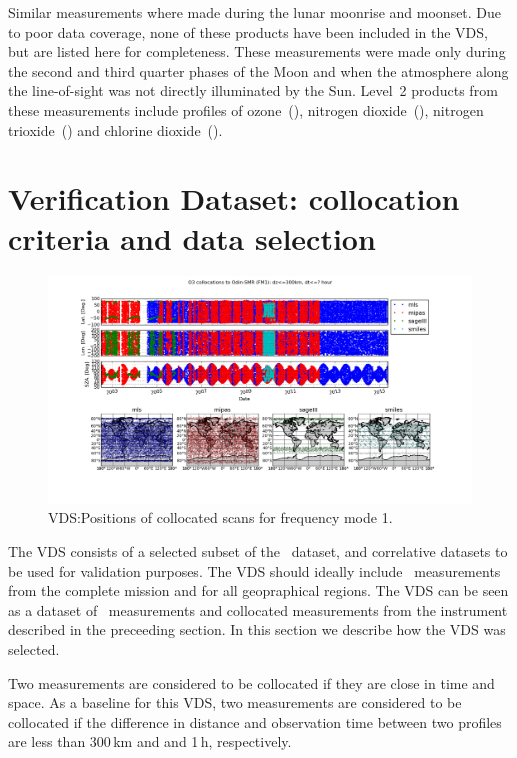 Similar measurements where made during the lunar moonrise and moonset. Due to
poor data coverage, none of these products have been included in the VDS, but
are listed here for completeness.  These measurements were made only during the
second and third quarter phases of the Moon and when the atmosphere along the
line-of-sight was not directly illuminated by the Sun.  Level~2 products from
these measurements include profiles of ozone~(), nitrogen
dioxide~(), nitrogen trioxide~() and chlorine
dioxide~().




\section{Verification Dataset: collocation criteria and data selection}
\label{sec:vdsselection}

\begin{figure}[t]
\centering
\includegraphics[width=17cm]{test_collocation_fm1.png}
\caption{VDS:Positions of collocated scans for frequency mode 1.}
\label{fig:vdsfm1}
\end{figure}


The VDS consists of a selected subset of the \smr\ dataset, and correlative
datasets to be used for validation purposes. 
The VDS should ideally include \smr\ measurements from    
the complete mission and for all geopraphical regions.
The VDS can be seen as a dataset of \smr\ measurements and
collocated measurements from the instrument described 
in the preceeding section. In this section we describe
how the VDS was selected.

 
Two measurements are considered to be collocated if they
are close in time and space. As a baseline for this VDS,
two measurements are considered to be collocated if the 
difference in distance and observation time between two profiles are 
less than 300\,km and and 1\,h, respectively.

